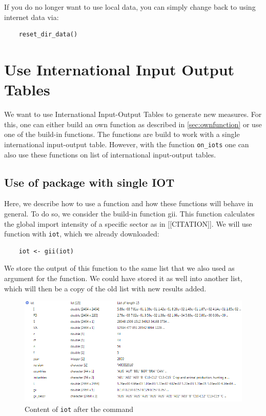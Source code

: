 \documentclass[10pt,a4paper]{paper}
\begin{document}
	If you do no longer want to use local data, you can simply change back to using internet data via:
	\begin{Verbatim}
	reset_dir_data()
	\end{Verbatim}
	
	\section{Use International Input Output Tables}
	We want to use International Input-Output Tables to generate new measures. For this, one can either build an own function as described in \ref{sec:ownfunction} or use one of the build-in functions. The functions are build to work with a single international input-output table. However, with the function \texttt{on\_iots} one can also use these functions on list of international input-output tables.
	
	\subsection{Use of package with single IOT}
	Here, we describe how to use a function and how these functions will behave in general. To do so, we consider the build-in function gii. This function  calculates the global import intensity of a specific sector as in [[CITATION]]. We will use function with \texttt{iot}, which we already downloaded:
	\begin{Verbatim}
	iot <- gii(iot)
	\end{Verbatim}
	We store the output of this function to the same list that we also used as argument for the function. We could have stored it as well into another list, which will then be a copy of the old list with new results added.
	
	\begin{figure}
	\centering
	\includegraphics[width=1\linewidth]{content_iot_function}
	\caption{Content of \texttt{iot} after the command}
	\label{fig:contentiotfunction}
	\end{figure}
\end{document}
